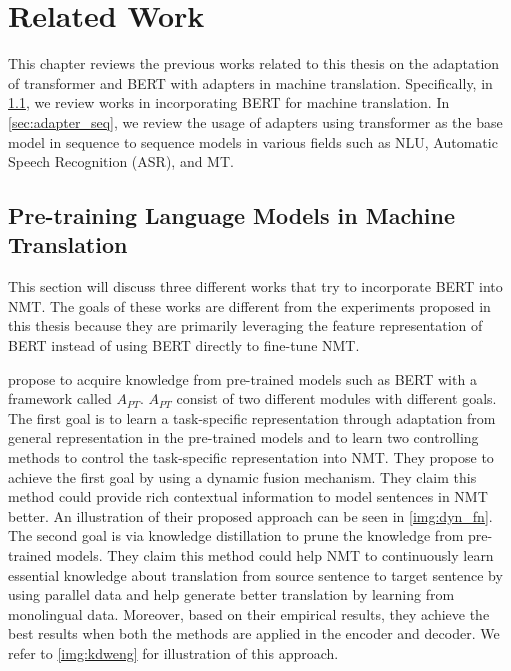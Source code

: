 \chapter{Related Work}

This chapter reviews the previous works related to this thesis on the adaptation of transformer and BERT with adapters in machine translation. Specifically, in \cref{sec:prelm_mt}, we review works in incorporating BERT for machine translation. In \cref{sec:adapter_seq}, we review the usage of adapters using transformer as the base model in sequence to sequence models in various fields such as NLU, Automatic Speech Recognition (ASR), and MT.

\section{Pre-training Language Models in Machine Translation}
\label{sec:prelm_mt}

This section will discuss three different works that try to incorporate BERT into NMT. The goals of these works are different from the experiments proposed in this thesis because they are primarily leveraging the feature representation of BERT instead of using BERT directly to fine-tune NMT.

 propose to acquire knowledge from pre-trained models such as BERT with a framework called $A_{PT}$. $A_{PT}$ consist of two different modules with different goals. The first goal is to learn a task-specific representation through adaptation from general representation in the pre-trained models and to learn two controlling methods to control the task-specific representation into NMT. They propose to achieve the first goal by using a dynamic fusion mechanism. They claim this method could provide rich contextual information to model sentences in NMT better. An illustration of their proposed approach can be seen in \cref{img:dyn_fn}. The second goal is via knowledge distillation to prune the knowledge from pre-trained models. They claim this method could help NMT to continuously learn essential knowledge about translation from source sentence to target sentence by using parallel data and help generate better translation by learning from monolingual data. Moreover, based on their empirical results, they achieve the best results when both the methods are applied in the encoder and decoder. We refer to \cref{img:kdweng} for illustration of this approach.

